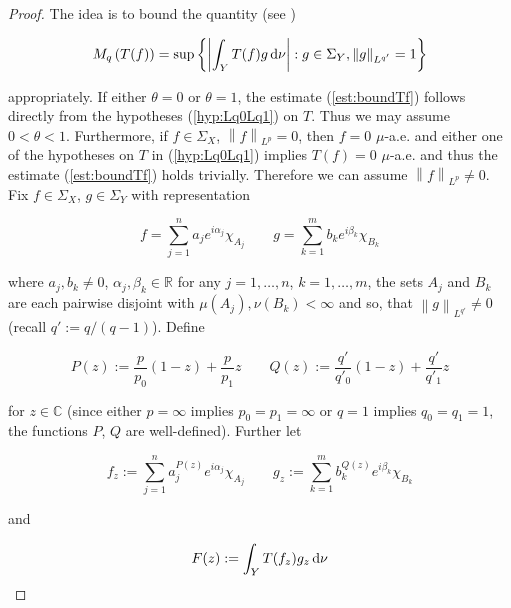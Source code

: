 \begin{proof}
	The idea is to bound the quantity (see \cite[189]{folland:real_analysis:1999})
	
	\begin{equation*}
		M_q\left( T(f) \right) = \sup\left\{ \left| \int_Y T(f)g \mathop{}\!\mathrm{d} \nu\right| : g \in \Sigma_Y, \left\| g\right\|_{L^{q'}} = 1\right\}
	\end{equation*}

	\noindent appropriately. If either $\theta = 0$ or $\theta = 1$, the estimate (\ref{est:boundTf}) follows directly from the hypotheses (\ref{hyp:Lq0Lq1}) on $T$. Thus we may assume \underline{$0 < \theta < 1$}. Furthermore, if $f \in \Sigma_X$, $\left\| f \right\|_{L^p} = 0$, then $f = 0$ $\mu$-a.e. and either one of the hypotheses on $T$ in (\ref{hyp:Lq0Lq1}) implies $T(f) = 0$ $\mu$-a.e. and thus the estimate (\ref{est:boundTf}) holds trivially. Therefore we can assume \underline{$\left\| f\right\|_{L^p} \neq 0$}. Fix $f \in \Sigma_X$, $g \in \Sigma_Y$ with representation
	
\begin{equation*}
	f = \sum_{j = 1}^n a_j e^{i\alpha_j}\chi_{A_j} \qquad g = \sum_{k = 1}^m b_k e^{i\beta_k}\chi_{B_k}
\end{equation*}

\noindent where $a_j,b_k \neq 0$, $\alpha_j,\beta_k \in \mathbb{R}$ for any $j = 1,\dots,n$, $k = 1,\dots,m$, the sets $A_j$ and $B_k$ are each pairwise disjoint with $\mu\left( A_j \right),\nu\left( B_k \right) < \infty$ and so, that $\left\| g\right\|_{L^{q'}} \neq 0$ (recall $q' := q/\left( q - 1 \right)$). Define

\begin{equation*}
	P(z) := \frac{p}{p_0}(1 - z) + \frac{p}{p_1}z \qquad Q(z) := \frac{q'}{q'_0}(1 - z) + \frac{q'}{q'_1}z
\end{equation*}

\noindent for $z \in \mathbb{C}$ (since either $p = \infty$ implies $p_0 = p_1 = \infty$ or $q = 1$ implies $q_0 = q_1 = 1$, the functions $P$, $Q$ are well-defined). Further let
				
\begin{equation}
	f_z := \sum_{j = 1}^n a^{P(z)}_j e^{i\alpha_j}\chi_{A_j} \qquad g_z :=  \sum_{k = 1}^m b^{Q(z)}_k e^{i\beta_k}\chi_{B_k}
	\label{eq:def_fzgz}
\end{equation}
				
\noindent and 

\begin{equation}
	F(z) := \int_Y T(f_z)g_z\mathop{}\!\mathrm{d}\nu
	\label{eq:def_F}
\end{equation}


\end{proof}

